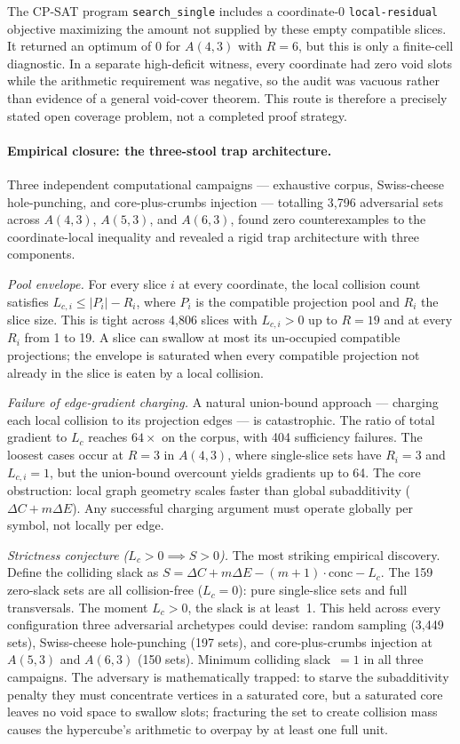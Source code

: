 The CP-SAT program \texttt{search\_single} includes a coordinate-0
\texttt{local-residual} objective maximizing the amount not supplied by these
empty compatible slices.  It returned an optimum of $0$ for
$A(4,3)$ with $R=6$, but this is only a finite-cell diagnostic.  In a separate
high-deficit witness, every coordinate had zero void slots while the arithmetic
requirement was negative, so the audit was vacuous rather than evidence of a
general void-cover theorem.  This route is therefore a precisely stated open
coverage problem, not a completed proof strategy.

\paragraph{Empirical closure: the three-stool trap architecture.}
Three independent computational campaigns --- exhaustive corpus, Swiss-cheese
hole-punching, and core-plus-crumbs injection --- totalling 3,796 adversarial
sets across $A(4,3)$, $A(5,3)$, and $A(6,3)$, found zero counterexamples to
the coordinate-local inequality and revealed a rigid trap architecture with
three components.

\emph{Pool envelope.}
For every slice $i$ at every coordinate, the local collision count satisfies
$L_{c,i}\le|P_i|-R_i$, where $P_i$ is the compatible projection pool and
$R_i$ the slice size.  This is tight across 4,806 slices with
$L_{c,i}>0$ up to $R=19$ and at every $R_i$ from 1 to 19.  A slice can
swallow at most its un-occupied compatible projections; the envelope is
saturated when every compatible projection not already in the slice is
eaten by a local collision.

\emph{Failure of edge-gradient charging.}
A natural union-bound approach --- charging each local collision to its
projection edges --- is catastrophic.  The ratio of total gradient to
$L_c$ reaches $64\times$ on the corpus, with 404 sufficiency failures.
The loosest cases occur at $R=3$ in $A(4,3)$, where single-slice sets
have $R_i=3$ and $L_{c,i}=1$, but the union-bound overcount yields
gradients up to 64.  The core obstruction: local graph geometry scales
faster than global subadditivity ($\Delta C+m\Delta E$).  Any successful
charging argument must operate globally per symbol, not locally per edge.

\emph{Strictness conjecture ($L_c>0\implies S>0$).}
The most striking empirical discovery.  Define the colliding slack as
$S=\Delta C+m\Delta E-(m+1)\cdot\mathrm{conc}-L_c$.  The 159 zero-slack sets
are all collision-free ($L_c=0$): pure single-slice sets and full
transversals.  The moment $L_c>0$, the slack is at least~1.  This held
across every configuration three adversarial archetypes could devise:
random sampling (3,449 sets), Swiss-cheese hole-punching (197 sets), and
core-plus-crumbs injection at $A(5,3)$ and $A(6,3)$ (150 sets).
Minimum colliding slack~$=1$ in all three campaigns.  The adversary is
mathematically trapped: to starve the subadditivity penalty they must
concentrate vertices in a saturated core, but a saturated core leaves no
void space to swallow slots; fracturing the set to create collision mass
causes the hypercube's arithmetic to overpay by at least one full unit.

